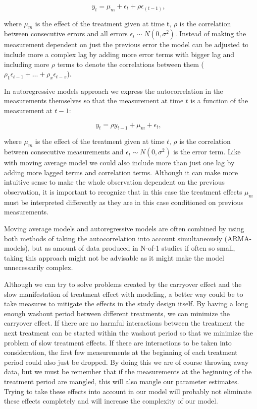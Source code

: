 \documentclass[12pt,a4paper,leqno]{report}
\theoremstyle{plain}
\theoremstyle{definition}
\theoremstyle{remark}
\begin{document}
\begin{def}\label{}
    \begin{equation}\label{movingaverage}
        y_t = \mu_m + \epsilon_t + \rho\epsilon_{(t - 1)},
    \end{equation}
\end{def}where \(\mu_m\) is the effect of the treatment given at time t, \(\rho
\) is the correlation between consecutive errors and all errors \(\epsilon_t \sim
N(0,\sigma^2) \). Instead of making the measurement dependent on just the previous error the model
can be adjusted to include more a complex lag by adding more error terms with
bigger lag and including more \(\rho \) terms to denote the correlations between
them (\(\rho_1\epsilon_{t-1} + \ldots + \rho_x\epsilon_{t-x}\)).

In autoregressive models approach we express the autocorrelation in the
measurements themselves so that the measurement at time \(t\) is a function of
the measurement at \(t-1\):

\begin{def}\label{}
    \begin{equation}\label{}
        y_t = \rho y_{t-1} + \mu_m + \epsilon_t,
    \end{equation}
\end{def}where \(\mu_m\) is the effect of the treatment given at time \(t\),
\(\rho \) is the correlation between consecutive measurements and \(\epsilon_t
\sim N(0,\sigma^2)\) is the error term. Like with moving average model we could
also include more than just one lag by adding more lagged terms and correlation
terms. Although it can make more intuitive sense to make the whole observation
dependent on the previous observation, it is important to recognize that in this
case the treatment effects \(\mu_m\) must be interpreted differently as they are
in this case conditioned on previous measurements.

Moving average models and autoregressive models are often combined by using both
methods of taking the autocorrelation into account simultaneously (ARMA-models), but as
amount of data produced in N-of-1 studies if often so small, taking this approach might not be advisable as it might make the model unnecessarily
complex.

Although we can try to solve problems created by the carryover effect and the slow
manifestation of treatment effect with modeling, a better way could be to take
measures to mitigate the effects in the study design itself. By having a long
enough washout period between different treatments, we can minimize the
carryover effect. If there are no harmful interactions between the treatment the
next treatment can be started within the washout period so that we minimize the
problem of slow treatment effects. If there are interactions to be taken into
consideration, the first few measurements at the beginning of each treatment
period could also just be dropped. By doing this we are of course throwing away
data, but we must be remember that if the measurements at the beginning of the
treatment period are mangled, this will also mangle our parameter estimates.
Trying to take these effects into account in our model will probably not
eliminate these effects completely and will increase the complexity of our
model.
\end{document}
